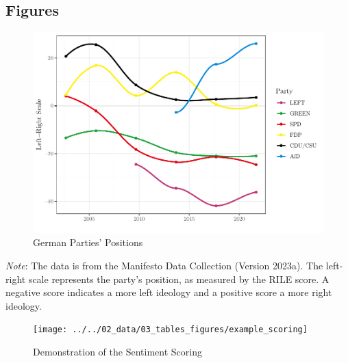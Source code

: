 \documentclass[a4paper,11pt]{article}
\begin{document}
\hypertarget{figures}{%
\subsection{Figures}\label{figures}}
\begin{figure}[H]

{\centering \includegraphics[width=1\linewidth]{thesis_files/figure-latex/partypositions-1} 

}

\caption{German Parties' Positions}\label{fig:partypositions}
\end{figure}
\vspace{-0.3cm}
\begin{center}
    \begin{minipage}{\linewidth}
    \scriptsize
    \textit{Note}: The data is from the Manifesto Data Collection (Version 2023a). The left-right scale represents the party's
    position, as measured by the RILE score. A negative score indicates a more left ideology and a positive score a more right ideology.
    \end{minipage}
\end{center}
\newpage
\begin{figure}[H]

{\centering \texttt{[image: ../../02\_data/03\_tables\_figures/example\_scoring]} 

}

\caption{Demonstration of the Sentiment Scoring}\label{fig:examplescoring}
\end{figure}
\newpage
\end{document}
